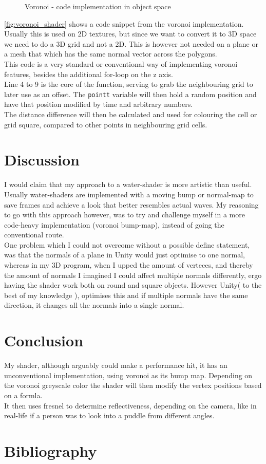 \documentclass{article}
\begin{document}
\begin{figure}[H]
    \centering
    
    \caption{Voronoi - code implementation in object space}
    \label{fig:voronoi_shader}
\end{figure}
\autoref{fig:voronoi_shader} shows a code snippet from the voronoi implementation. Usually this is used on 2D textures, but since we want to convert it to 3D space we need to do a 3D grid and not a 2D. This is however not needed on a plane or a mesh that which has the same normal vector across the polygons.\\
This code is a very standard or conventional way of implementing voronoi features, besides the additional for-loop on the z axis.\\

Line 4 to 9 is the core of the function, serving to grab the neighbouring grid to later use as an offset. The \texttt{pointt} variable will then hold a random position and have that position modified by time and arbitrary numbers.\\The distance difference will then be calculated and used for colouring the cell or grid square, compared to other points in neighbouring grid cells.

\section{Discussion}
\label{sec:discussion}
I would claim that my approach to a water-shader is more artistic than useful. Usually water-shaders are implemented with a moving bump or normal-map to save frames and achieve a look that better resembles actual waves. My reasoning to go with this approach however, was to try and challenge myself in a more code-heavy implementation (voronoi bump-map), instead of going the conventional route.\\

One problem which I could not overcome without a possible define statement, was that the normals of a plane in Unity would just optimise to one normal, whereas in my 3D program, when I upped the amount of verteces, and thereby the amount of normals I imagined I could affect multiple normals differently, ergo having the shader work both on round and square objects. However Unity( to the best of my knowledge ), optimises this and if multiple normals have the same direction, it changes all the normals into a single normal.

\section{Conclusion}
\label{sec:conclusion}
My shader, although arguably could make a performance hit, it has an unconventional implementation, using voronoi as its bump map. Depending on the voronoi greyscale color the shader will then modify the vertex positions based on a formla.\\It then uses fresnel to determine reflectiveness, depending on the camera, like in real-life if a person was to look into a puddle from different angles.


\newpage
\section{Bibliography}
\printbibliography
\end{document}
